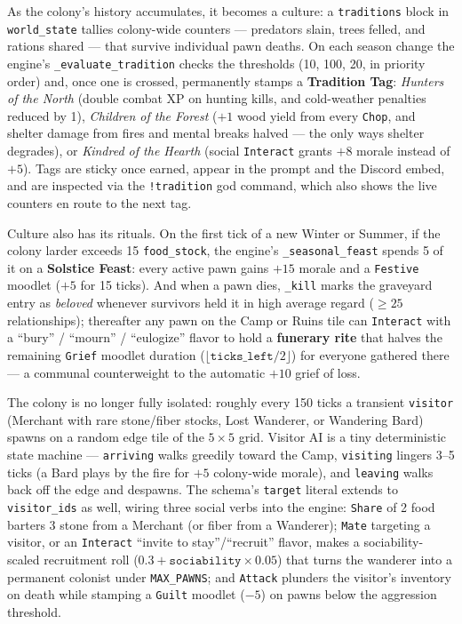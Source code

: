 \documentclass[10pt,a4paper]{article}
\begin{document}
As the colony's history accumulates, it becomes a culture: a \texttt{traditions} block in \texttt{world\_state} tallies colony-wide counters --- predators slain, trees felled, and rations shared --- that survive individual pawn deaths. On each season change the engine's \texttt{\_evaluate\_tradition} checks the thresholds (10, 100, 20, in priority order) and, once one is crossed, permanently stamps a \textbf{Tradition Tag}: \emph{Hunters of the North} (double combat XP on hunting kills, and cold-weather penalties reduced by 1), \emph{Children of the Forest} ($+1$ wood yield from every \texttt{Chop}, and shelter damage from fires and mental breaks halved --- the only ways shelter degrades), or \emph{Kindred of the Hearth} (social \texttt{Interact} grants $+8$ morale instead of $+5$). Tags are sticky once earned, appear in the prompt and the Discord embed, and are inspected via the \texttt{!tradition} god command, which also shows the live counters en route to the next tag.

Culture also has its rituals. On the first tick of a new Winter or Summer, if the colony larder exceeds 15 \texttt{food\_stock}, the engine's \texttt{\_seasonal\_feast} spends 5 of it on a \textbf{Solstice Feast}: every active pawn gains $+15$ morale and a \texttt{Festive} moodlet ($+5$ for 15 ticks). And when a pawn dies, \texttt{\_kill} marks the graveyard entry as \emph{beloved} whenever survivors held it in high average regard ($\geq 25$ relationships); thereafter any pawn on the Camp or Ruins tile can \texttt{Interact} with a ``bury'' / ``mourn'' / ``eulogize'' flavor to hold a \textbf{funerary rite} that halves the remaining \texttt{Grief} moodlet duration ($\lfloor \texttt{ticks\_left}/2 \rfloor$) for everyone gathered there --- a communal counterweight to the automatic $+10$ grief of loss.

The colony is no longer fully isolated: roughly every 150 ticks a transient \texttt{visitor} (Merchant with rare stone/fiber stocks, Lost Wanderer, or Wandering Bard) spawns on a random edge tile of the $5\times5$ grid. Visitor AI is a tiny deterministic state machine --- \texttt{arriving} walks greedily toward the Camp, \texttt{visiting} lingers 3--5 ticks (a Bard plays by the fire for $+5$ colony-wide morale), and \texttt{leaving} walks back off the edge and despawns. The schema's \texttt{target} literal extends to \texttt{visitor\_ids} as well, wiring three social verbs into the engine: \texttt{Share} of 2 food barters 3 stone from a Merchant (or fiber from a Wanderer); \texttt{Mate} targeting a visitor, or an \texttt{Interact} ``invite to stay''/``recruit'' flavor, makes a sociability-scaled recruitment roll ($0.3 + \texttt{sociability} \times 0.05$) that turns the wanderer into a permanent colonist under \texttt{MAX\_PAWNS}; and \texttt{Attack} plunders the visitor's inventory on death while stamping a \texttt{Guilt} moodlet ($-5$) on pawns below the aggression threshold.
\end{document}
